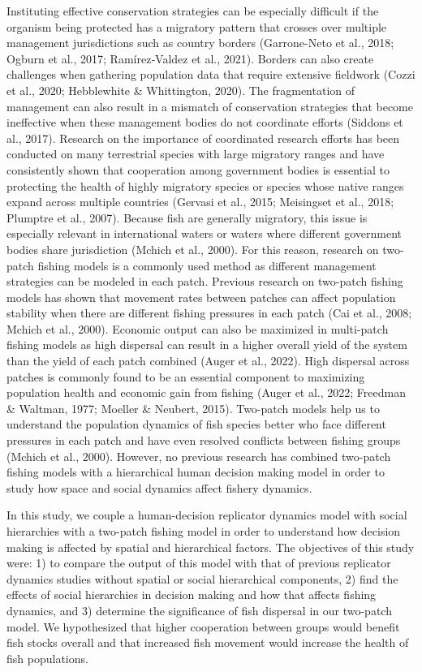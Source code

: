 \documentclass[
]{article}
\begin{document}
Instituting effective conservation strategies can be especially difficult if the organism being protected has a migratory pattern that crosses over multiple management jurisdictions such as country borders (Garrone-Neto et al., 2018; Ogburn et al., 2017; Ramírez‐Valdez et al., 2021). Borders can also create challenges when gathering population data that require extensive fieldwork (Cozzi et al., 2020; Hebblewhite \& Whittington, 2020). The fragmentation of management can also result in a mismatch of conservation strategies that become ineffective when these management bodies do not coordinate efforts (Siddons et al., 2017). Research on the importance of coordinated research efforts has been conducted on many terrestrial species with large migratory ranges and have consistently shown that cooperation among government bodies is essential to protecting the health of highly migratory species or species whose native ranges expand across multiple countries (Gervasi et al., 2015; Meisingset et al., 2018; Plumptre et al., 2007). Because fish are generally migratory, this issue is especially relevant in international waters or waters where different government bodies share jurisdiction (Mchich et al., 2000). For this reason, research on two-patch fishing models is a commonly used method as different management strategies can be modeled in each patch. Previous research on two-patch fishing models has shown that movement rates between patches can affect population stability when there are different fishing pressures in each patch (Cai et al., 2008; Mchich et al., 2000). Economic output can also be maximized in multi-patch fishing models as high dispersal can result in a higher overall yield of the system than the yield of each patch combined (Auger et al., 2022). High dispersal across patches is commonly found to be an essential component to maximizing population health and economic gain from fishing (Auger et al., 2022; Freedman \& Waltman, 1977; Moeller \& Neubert, 2015). Two-patch models help us to understand the population dynamics of fish species better who face different pressures in each patch and have even resolved conflicts between fishing groups (Mchich et al., 2000). However, no previous research has combined two-patch fishing models with a hierarchical human decision making model in order to study how space and social dynamics affect fishery dynamics.

In this study, we couple a human-decision replicator dynamics model with social hierarchies with a two-patch fishing model in order to understand how decision making is affected by spatial and hierarchical factors. The objectives of this study were: 1) to compare the output of this model with that of previous replicator dynamics studies without spatial or social hierarchical components, 2) find the effects of social hierarchies in decision making and how that affects fishing dynamics, and 3) determine the significance of fish dispersal in our two-patch model. We hypothesized that higher cooperation between groups would benefit fish stocks overall and that increased fish movement would increase the health of fish populations.
\end{document}
